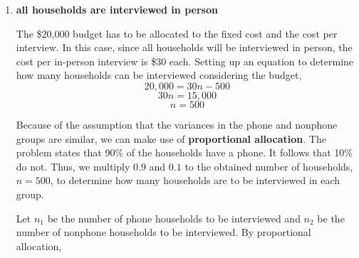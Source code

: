\documentclass[]{article}
\begin{document}
\begin{enumerate}[label=(\alph*)]

\item \textbf{all households are interviewed in person}

The \$20,000 budget has to be allocated to the fixed cost and the cost per interview. In this case, since all households will be interviewed in person, the cost per in-person interview is \$30 each. Setting up an equation to determine how many households can be interviewed considering the budget,
\[
20,000 = 30n - 500
\]
\[
30n = 15,000
\]
\[
n = 500
\]

Because of the assumption that the variances in the phone and nonphone groups are similar, we can make use of \textbf{proportional allocation}. The problem states that 90\% of the households have a phone. It follows that 10\% do not. Thus, we multiply $0.9$ and $0.1$ to the obtained number of households, $n=500$, to determine how many households are to be interviewed in each group.

Let $n_1$ be the number of phone households to be interviewed and $n_2$ be the number of nonphone households to be interviewed. By proportional allocation, 


\end{enumerate}
\end{document}
